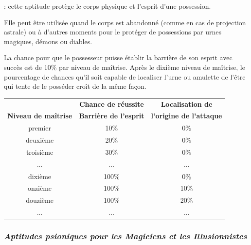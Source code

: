 \documentclass[11pt]{article}
\newcommand{\uline}[1]{\underline{\smash{#1}\vphantom{T}}\vphantom{#1}}
\begin{document}
{\bigskip

\label{guerrier-barriere-esprit}\textbf{\uline{Barrière de l'esprit (0)}} : cette aptitude protège le corps physique et l'esprit d'une possession.

\bigskip

Elle peut être utilisée quand le corps est abandonné (comme en cas de projection astrale) ou à d'autres moments pour le protéger de possessions par urnes magiques, démons ou diables.

\bigskip

La chance pour que le possesseur puisse établir la barrière de son esprit avec succès est de 10\% par niveau de maîtrise. Après le dixième niveau de maîtrise, le pourcentage de chances qu'il soit capable de localiser l'urne ou amulette de l'être qui tente de le posséder croît de la même façon.

\bigskip

\begin{tabular}{ccc}
&\textbf{Chance de réussite} & \textbf{Localisation de} \\
\textbf{Niveau de maîtrise} & \textbf{Barrière de l'esprit} & \textbf{l'origine de l'attaque}\\
premier     & 10\%  & 0\% \\
deuxième    & 20\%  & 0\% \\
troisième   & 30\%  & 0\% \\
...         & ...   & ... \\
dixième     & 100\% & 0\% \\
onzième     & 100\% & 10\% \\
douzième    & 100\% & 20\% \\
...         & ...   & ... \\
\end{tabular}










\newpage
\subsubsection*{\textit{Aptitudes psioniques pour les Magiciens et les Illusionnistes}}

}
\end{document}
